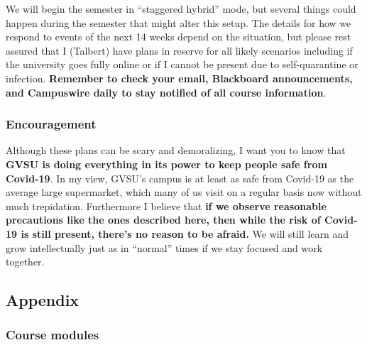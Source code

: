 \documentclass[]{article}
\begin{document}
We will begin the semester in ``staggered hybrid'' mode, but several
things could happen during the semester that might alter this setup. The
details for how we respond to events of the next 14 weeks depend on the
situation, but please rest assured that I (Talbert) have plans in
reserve for all likely scenarios including if the university goes fully
online or if I cannot be present due to self-quarantine or infection.
\textbf{Remember to check your email, Blackboard announcements, and
Campuswire daily to stay notified of all course information}.

\hypertarget{encouragement}{%
\subsubsection{Encouragement}\label{encouragement}}

Although these plans can be scary and demoralizing, I want you to know
that \textbf{GVSU is doing everything in its power to keep people safe
from Covid-19}. In my view, GVSU's campus is at least as safe from
Covid-19 as the average large supermarket, which many of us visit on a
regular basis now without much trepidation. Furthermore I believe that
\textbf{if we observe reasonable precautions like the ones described
here, then while the risk of Covid-19 is still present, there's no
reason to be afraid.} We will still learn and grow intellectually just
as in ``normal'' times if we stay focused and work together.

\hypertarget{appendix}{%
\subsection{Appendix}\label{appendix}}

\hypertarget{course-modules}{%
\subsubsection{Course modules}\label{course-modules}}
\end{document}
